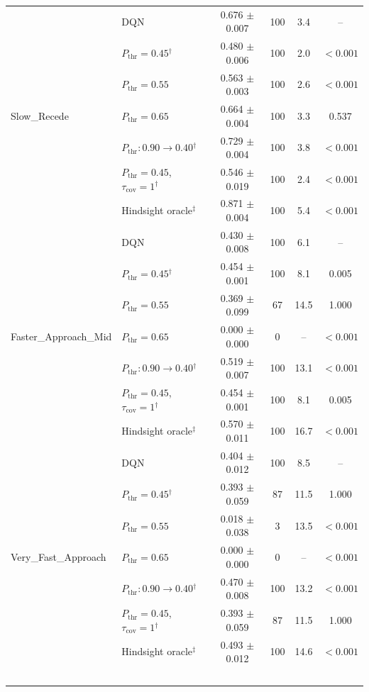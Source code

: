 \begin{table}[htbp]
\begin{tabular}{llcccc}
\midrule
\multirow{7}{*}{Slow\_Recede} & DQN & 0.676 $\pm$ 0.007 & 100 & 3.4 & -- \\
 & $P_{\mathrm{thr}}=0.45$$^{\dagger}$ & 0.480 $\pm$ 0.006 & 100 & 2.0 & $<0.001$ \\
 & $P_{\mathrm{thr}}=0.55$ & 0.563 $\pm$ 0.003 & 100 & 2.6 & $<0.001$ \\
 & $P_{\mathrm{thr}}=0.65$ & 0.664 $\pm$ 0.004 & 100 & 3.3 & 0.537 \\
 & $P_{\mathrm{thr}}: 0.90 \to 0.40$$^{\dagger}$ & 0.729 $\pm$ 0.004 & 100 & 3.8 & $<0.001$ \\
 & $P_{\mathrm{thr}}=0.45$, $\tau_{\mathrm{cov}}=1$$^{\dagger}$ & 0.546 $\pm$ 0.019 & 100 & 2.4 & $<0.001$ \\
 & Hindsight oracle$^{\ddagger}$ & 0.871 $\pm$ 0.004 & 100 & 5.4 & $<0.001$ \\
\midrule
\multirow{7}{*}{Faster\_Approach\_Mid} & DQN & 0.430 $\pm$ 0.008 & 100 & 6.1 & -- \\
 & $P_{\mathrm{thr}}=0.45$$^{\dagger}$ & 0.454 $\pm$ 0.001 & 100 & 8.1 & 0.005 \\
 & $P_{\mathrm{thr}}=0.55$ & 0.369 $\pm$ 0.099 & 67 & 14.5 & 1.000 \\
 & $P_{\mathrm{thr}}=0.65$ & 0.000 $\pm$ 0.000 & 0 & -- & $<0.001$ \\
 & $P_{\mathrm{thr}}: 0.90 \to 0.40$$^{\dagger}$ & 0.519 $\pm$ 0.007 & 100 & 13.1 & $<0.001$ \\
 & $P_{\mathrm{thr}}=0.45$, $\tau_{\mathrm{cov}}=1$$^{\dagger}$ & 0.454 $\pm$ 0.001 & 100 & 8.1 & 0.005 \\
 & Hindsight oracle$^{\ddagger}$ & 0.570 $\pm$ 0.011 & 100 & 16.7 & $<0.001$ \\
\midrule
\multirow{7}{*}{Very\_Fast\_Approach} & DQN & 0.404 $\pm$ 0.012 & 100 & 8.5 & -- \\
 & $P_{\mathrm{thr}}=0.45$$^{\dagger}$ & 0.393 $\pm$ 0.059 & 87 & 11.5 & 1.000 \\
 & $P_{\mathrm{thr}}=0.55$ & 0.018 $\pm$ 0.038 & 3 & 13.5 & $<0.001$ \\
 & $P_{\mathrm{thr}}=0.65$ & 0.000 $\pm$ 0.000 & 0 & -- & $<0.001$ \\
 & $P_{\mathrm{thr}}: 0.90 \to 0.40$$^{\dagger}$ & 0.470 $\pm$ 0.008 & 100 & 13.2 & $<0.001$ \\
 & $P_{\mathrm{thr}}=0.45$, $\tau_{\mathrm{cov}}=1$$^{\dagger}$ & 0.393 $\pm$ 0.059 & 87 & 11.5 & 1.000 \\
 & Hindsight oracle$^{\ddagger}$ & 0.493 $\pm$ 0.012 & 100 & 14.6 & $<0.001$ \\
$$
\end{tabular}
\end{table}
